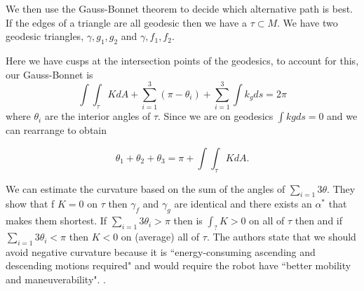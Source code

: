 We then use the Gauss-Bonnet theorem to decide which alternative path is best.
If the edges of a triangle are all geodesic then we have a  $\tau\subset M$.
We have two geodesic triangles, $\gamma, g_1,g_2$ and $\gamma,f_1,f_2.$

Here we have cusps at the intersection points of the geodesics,
to account for this, our Gauss-Bonnet is 
\begin{equation}\label{eqn:b-g-angles}
\int \int_{\tau} K dA +\sum_{i=1}^3(\pi-\theta_i)+\sum_{i=1}^3 \int k_gds =2\pi
\end{equation}
where $\theta_i$ are the interior angles of $\tau$.
Since we are on geodesics $\int kgds =0$ and we can rearrange
 to obtain

\begin{equation} \label{eqn:interior-angles}
\theta_1+\theta_2+\theta_3 = \pi +\int \int_{\tau} K dA.
\end{equation}

We can estimate the curvature based on the sum of the angles of
$\sum_{i=1}3\theta$.
They show that f $K=0$ on $\tau$ then $\gamma_f$ and $\gamma_g$
are identical and there exists an $\alpha^*$ that makes them shortest.
If $\sum_{i=1}3\theta_i>\pi$ then is $\int_?K>0$ on all of $\tau$ then and if $\sum_{i=1}3\theta_i<\pi$
then $K<0$ on (average) all of $\tau$.
The authors state that we should avoid negative curvature because it
is ``energy-consuming ascending and descending motions required"
and would require the robot have ``better mobility and maneuverability".
.


